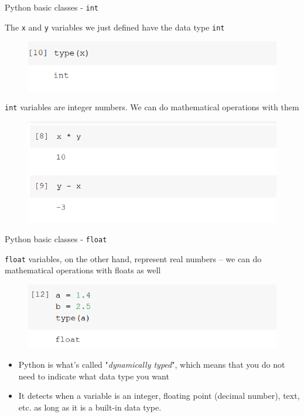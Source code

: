 \documentclass[aspectratio=169]{beamer}
\begin{document}
\begin{frame}{Python basic classes - \texttt{int}}

	The \texttt{x} and \texttt{y} variables we just defined have the data type \texttt{int}

	\begin{figure}
		\centering
		\includegraphics[width=0.6\linewidth]{img/type_int.png}
	\end{figure}

	\texttt{int} variables are integer numbers. We can do mathematical operations with them
	\begin{figure}
		\centering
		\includegraphics[width=0.6\linewidth]{img/math_integers.png}
	\end{figure}

\end{frame}

\begin{frame}{Python basic classes - \texttt{float}}

	\texttt{float} variables, on the other hand, represent real numbers 
	-- we can do mathematical operations with floats as well

	\begin{figure}
		\centering
		\includegraphics[width=0.6\linewidth]{img/type_float.png}
	\end{figure}

	\begin{itemize}	
		\item Python is what's called "\textit{dynamically typed}", 
	which means that you do not need to indicate what data type you want
		\item It detects when a variable is an integer, floating point (decimal number), 
	text, etc. as long as it is a built-in data type.
	\end{itemize}

\end{frame}
\end{document}
